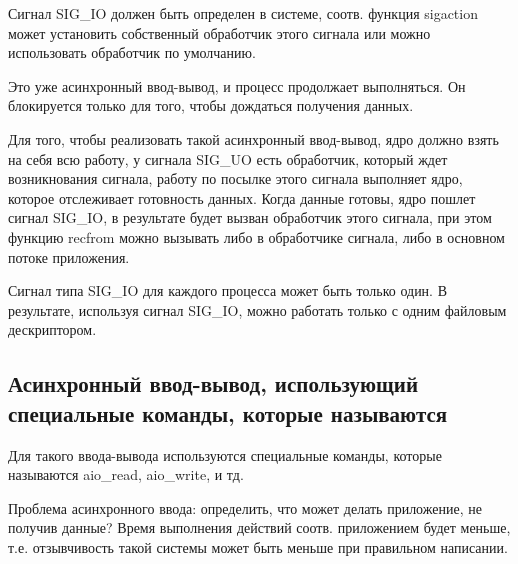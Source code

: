 \documentclass[12pt,a4paper]{scrreprt}
\begin{document}
Сигнал SIG\_IO должен быть определен в системе, соотв. функция sigaction может установить собственный обработчик этого сигнала или можно использовать обработчик по умолчанию. 

Это уже асинхронный ввод-вывод, и процесс продолжает выполняться. Он блокируется только для того, чтобы дождаться получения данных. 

Для того, чтобы реализовать такой асинхронный ввод-вывод, ядро должно взять на себя всю работу, у сигнала SIG\_UO есть обработчик, который ждет возникнования сигнала, работу по посылке этого сигнала выполняет ядро, которое отслеживает готовность данных. Когда данные готовы, ядро пошлет сигнал SIG\_IO, в результате будет вызван обработчик этого сигнала, при этом функцию recfrom можно вызывать либо в обработчике сигнала, либо в основном потоке приложения.

Сигнал типа SIG\_IO для каждого процесса может быть только один. В результате, используя сигнал SIG\_IO, можно работать только с одним файловым дескриптором.

\subsection*{Асинхронный ввод-вывод, использующий специальные команды, которые называются }

Для такого ввода-вывода используются специальные команды, которые называются aio\_read, aio\_write, и тд.

\begin{figure}[!h]
\end{figure}

Проблема асинхронного ввода: определить, что может делать приложение, не получив данные? Время выполнения действий соотв. приложением будет меньше, т.е. отзывчивость такой системы может быть меньше при правильном написании.
\end{document}

